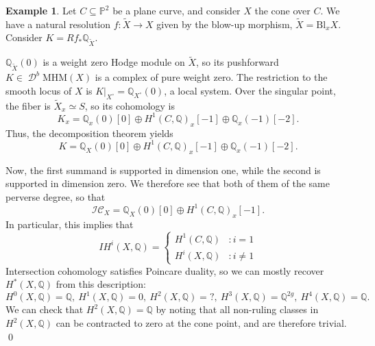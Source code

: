 \documentclass[12pt]{amsart}
\newcommand{\Q}{\mathbb{Q}}
\DeclareMathOperator{\D}{\mathcal{D}}
\newcommand{\wt}{\widetilde}
\theoremstyle{definition}
\newtheorem{example}[theorem]{Example}
\theoremstyle{remark}
\numberwithin{equation}{section}
\begin{document}
\begin{example}
Let \(C \subseteq \mathbb{P}^2\) be a plane curve, and consider \(X\) the cone
over \(C\). We have a natural resolution \(f: \wt{X} \to X\) given by the blow-up 
morphism, \(\wt{X} = \mathrm{Bl}_x X\). Consider \(K = Rf_* \Q_{\wt{X}}\).

\(\Q_{\wt X}(0)\) is a weight zero Hodge module on \(\wt{X}\), so its pushforward 
\(K \in \D^b\mathrm{MHM}(X)\) is a complex of pure weight zero. The restriction 
to the smooth locus of \(X\) is \(K|_{X^\circ} = \Q_{X^\circ}(0)\), a local system.
Over the singular point, the fiber is \(\wt{X}_x \simeq S\), so its cohomology is
\begin{equation}
    K_x = \Q_x(0)[0] \oplus H^1(C, \Q)_x[-1] \oplus \Q_x(-1)[-2].
\end{equation}
Thus, the decomposition theorem yields 
\begin{equation}
    K = \Q_X(0)[0] \oplus H^1(C, \Q)_x[-1] \oplus \Q_x(-1)[-2].
\end{equation}

Now, the first summand is supported in dimension one, while the second is supported 
in dimension zero. We therefore see that both of them of the same perverse degree,
so that 
\begin{equation}
    \mathscr{IC}_X = \Q_X(0)[0] \oplus H^1(C, \Q)_x[-1].
\end{equation}
In particular, this implies that 
\begin{equation}
    IH^i(X, \Q) = \begin{cases}
        H^1(C, \Q) & : i = 1 \\
        H^i(X, \Q) & : i \neq 1
    \end{cases}
\end{equation}
Intersection cohomology satisfies Poincare duality, so we can mostly recover 
\(H^*(X, \Q)\) from this description:
\begin{equation}
    H^0(X, \Q) = \Q,\ H^1(X, \Q) = 0,\ H^2(X, \Q) = ?,\ H^3(X, \Q) = \Q^{2g},\ 
    H^4(X, \Q) = \Q.
\end{equation}
We can check that \(H^2(X, \Q) = \Q\) by noting that all non-ruling classes in 
\(H^2(X, \Q)\) can be contracted to zero at the cone point, and are therefore trivial.
\qed
\end{example}
\end{document}
